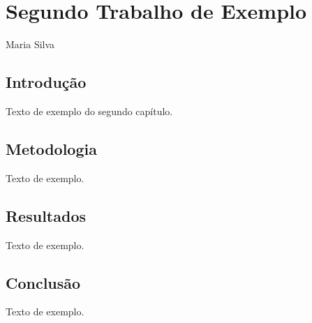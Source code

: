 
\chapter{Segundo Trabalho de Exemplo}

\begin{center}
Maria Silva
\end{center}

\begin{abstract}
Resumo do segundo trabalho (exemplo, só pra teste de compilação).
\end{abstract}

\section{Introdução}
Texto de exemplo do segundo capítulo.

\section{Metodologia}
Texto de exemplo.

\section{Resultados}
Texto de exemplo.

\section{Conclusão}
Texto de exemplo.